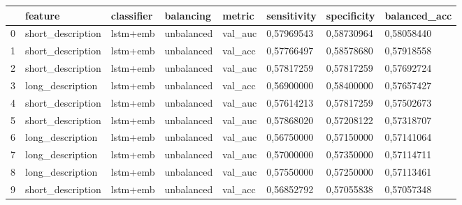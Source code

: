 \begin{tabular}{llllllll}
\toprule
{} &            feature & classifier &   balancing &   metric & sensitivity & specificity & balanced\_acc \\
\midrule
0 &  short\_description &   lstm+emb &  unbalanced &  val\_auc &  0,57969543 &  0,58730964 &   0,58058440 \\
1 &  short\_description &   lstm+emb &  unbalanced &  val\_acc &  0,57766497 &  0,58578680 &   0,57918558 \\
2 &  short\_description &   lstm+emb &  unbalanced &  val\_auc &  0,57817259 &  0,57817259 &   0,57692724 \\
3 &   long\_description &   lstm+emb &  unbalanced &  val\_acc &  0,56900000 &  0,58400000 &   0,57657427 \\
4 &  short\_description &   lstm+emb &  unbalanced &  val\_auc &  0,57614213 &  0,57817259 &   0,57502673 \\
5 &  short\_description &   lstm+emb &  unbalanced &  val\_auc &  0,57868020 &  0,57208122 &   0,57318707 \\
6 &   long\_description &   lstm+emb &  unbalanced &  val\_auc &  0,56750000 &  0,57150000 &   0,57141064 \\
7 &   long\_description &   lstm+emb &  unbalanced &  val\_auc &  0,57000000 &  0,57350000 &   0,57114711 \\
8 &   long\_description &   lstm+emb &  unbalanced &  val\_auc &  0,57550000 &  0,57250000 &   0,57113461 \\
9 &  short\_description &   lstm+emb &  unbalanced &  val\_acc &  0,56852792 &  0,57055838 &   0,57057348 \\
\bottomrule
\end{tabular}
